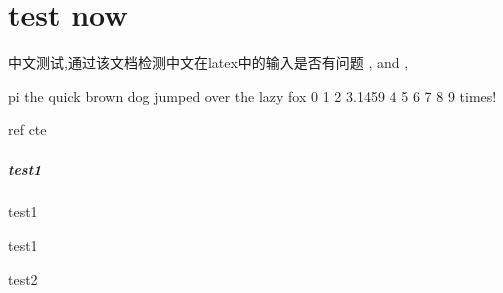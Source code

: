\documentclass{ctexart}
\begin{document}
\chapter{test now}
\label{chap:testlk}
中文测试,通过该文档检测中文在latex中的输入是否有问题
\alpha , \beta  and ,\gamma

pi
the quick brown dog jumped over the lazy fox 0 1 2 3.1459 4 5 6 7 8 9 times!




ref
cte

\paragraph{test1}

test1 \cite{Murray2009hydrogen}




test1 \cite{Murray2009hydrogen}



test2 \cite{Murray}
\end{document}
